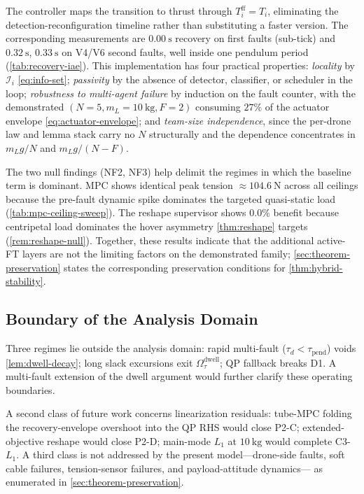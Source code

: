 \documentclass[lettersize,journal]{IEEEtran}
\begin{document}
The controller maps the transition to thrust through $T_i^{\mathrm{ff}}=T_i$, eliminating the detection-reconfiguration timeline rather than substituting a faster version. The corresponding measurements are $\SI{0.00}{\second}$ recovery on first faults (sub-tick) and $\SI{0.32}{\second}$, $\SI{0.33}{\second}$ on V4/V6 second faults, well inside one pendulum period (\cref{tab:recovery-iae}). This implementation has four practical properties: \emph{locality} by $\mathcal{I}_i$ \eqref{eq:info-set}; \emph{passivity} by the absence of detector, classifier, or scheduler in the loop; \emph{robustness to multi-agent failure} by induction on the fault counter, with the demonstrated $(N{=}5,m_L{=}\SI{10}{\kilo\gram},F{=}2)$ consuming $27\%$ of the actuator envelope \eqref{eq:actuator-envelope}; and \emph{team-size independence}, since the per-drone law and lemma stack carry no $N$ structurally and the dependence concentrates in $m_Lg/N$ and $m_Lg/(N{-}F)$.

The two null findings (NF2, NF3) help delimit the regimes in which the baseline term is dominant. MPC shows identical peak tension $\approx \SI{104.6}{\newton}$ across all ceilings because the pre-fault dynamic spike dominates the targeted quasi-static load (\cref{tab:mpc-ceiling-sweep}). The reshape supervisor shows $0.0\%$ benefit because centripetal load dominates the hover asymmetry \cref{thm:reshape} targets (\cref{rem:reshape-null}). Together, these results indicate that the additional active-FT layers are not the limiting factors on the demonstrated family; \cref{sec:theorem-preservation} states the corresponding preservation conditions for \cref{thm:hybrid-stability}.

\subsection{Boundary of the Analysis Domain}
\label{sec:discussion-boundary}

Three regimes lie outside the analysis domain: rapid multi-fault ($\tau_d < \tau_{\mathrm{pend}}$) voids \cref{lem:dwell-decay}; long slack excursions exit $\Omega^{\mathrm{dwell}}_{\tau}$; QP fallback breaks D1. A multi-fault extension of the dwell argument would further clarify these operating boundaries.

A second class of future work concerns linearization residuals: tube-MPC folding the recovery-envelope overshoot into the QP RHS would close P2-C; extended-objective reshape would close P2-D; main-mode $L_1$ at $\SI{10}{\kilo\gram}$ would complete C3-$L_1$. A third class is not addressed by the present model---drone-side faults, soft cable failures, tension-sensor failures, and payload-attitude dynamics--- as enumerated in \cref{sec:theorem-preservation}.
\end{document}
